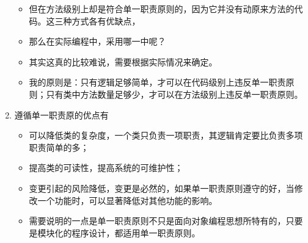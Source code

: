 \documentclass[9pt, b5paper]{article}
\begin{document}
\begin{enumerate}
\begin{itemize}
\item 但在方法级别上却是符合单一职责原则的，因为它并没有动原来方法的代码。这三种方式各有优缺点，
\item 那么在实际编程中，采用哪一中呢？
\item 其实这真的比较难说，需要根据实际情况来确定。
\item 我的原则是：只有逻辑足够简单，才可以在代码级别上违反单一职责原则；只有类中方法数量足够少，才可以在方法级别上违反单一职责原则。
\end{itemize}
\item 遵循单一职责原的优点有
\label{sec:org189e442}
\begin{itemize}
\item 可以降低类的复杂度，一个类只负责一项职责，其逻辑肯定要比负责多项职责简单的多；
\item 提高类的可读性，提高系统的可维护性；
\item 变更引起的风险降低，变更是必然的，如果单一职责原则遵守的好，当修改一个功能时，可以显著降低对其他功能的影响。
\item 需要说明的一点是单一职责原则不只是面向对象编程思想所特有的，只要是模块化的程序设计，都适用单一职责原则。
\end{itemize}
\end{enumerate}
\end{document}
